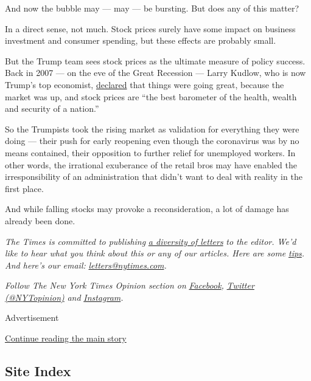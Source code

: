 And now the bubble may --- may --- be bursting. But does any of this
matter?

In a direct sense, not much. Stock prices surely have some impact on
business investment and consumer spending, but these effects are
probably small.

But the Trump team sees stock prices as the ultimate measure of policy
success. Back in 2007 --- on the eve of the Great Recession --- Larry
Kudlow, who is now Trump's top economist,
\href{https://www.realclearpolitics.com/articles/2007/07/a_stock_market_vote_of_confide.html}{declared}
that things were going great, because the market was up, and stock
prices are ``the best barometer of the health, wealth and security of a
nation.''

So the Trumpists took the rising market as validation for everything
they were doing --- their push for early reopening even though the
coronavirus was by no means contained, their opposition to further
relief for unemployed workers. In other words, the irrational exuberance
of the retail bros may have enabled the irresponsibility of an
administration that didn't want to deal with reality in the first place.

And while falling stocks may provoke a reconsideration, a lot of damage
has already been done.

\emph{The Times is committed to publishing}
\href{https://www.nytimes.com/2019/01/31/opinion/letters/letters-to-editor-new-york-times-women.html}{\emph{a
diversity of letters}} \emph{to the editor. We'd like to hear what you
think about this or any of our articles. Here are some}
\href{https://help.nytimes.com/hc/en-us/articles/115014925288-How-to-submit-a-letter-to-the-editor}{\emph{tips}}\emph{.
And here's our email:}
\href{mailto:letters@nytimes.com}{\emph{letters@nytimes.com}}\emph{.}

\emph{Follow The New York Times Opinion section on}
\href{https://www.facebook.com/nytopinion}{\emph{Facebook}}\emph{,}
\href{http://twitter.com/NYTOpinion}{\emph{Twitter (@NYTopinion)}}
\emph{and}
\href{https://www.instagram.com/nytopinion/}{\emph{Instagram}}\emph{.}

Advertisement

\protect\hyperlink{after-bottom}{Continue reading the main story}

\hypertarget{site-index}{%
\subsection{Site Index}\label{site-index}}

